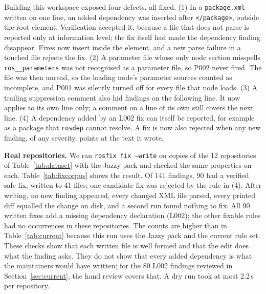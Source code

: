 \documentclass[conference]{IEEEtran}
\newcommand{\code}[1]{\texttt{#1}}
\begin{document}
Building this workspace exposed four defects, all fixed. (1) In a \code{package.xml} written on
one line, an added dependency was inserted after \code{</package>}, outside the root element.
Verification accepted it, because a file that does not parse is reported only at information
level; the fix itself had made the dependency finding disappear. Fixes now insert inside the
element, and a new parse failure in a touched file rejects the fix. (2) A parameter file whose
only node section misspells \code{ros\_\_parameters} was not recognised as a parameter file, so
P002 never fired. The file was then unread, so the loading node's parameter sources counted as
incomplete, and P001 was silently turned off for every file that node loads. (3) A trailing
suppression comment also hid findings on the following line. It now applies to its own line
only; a comment on a line of its own still covers the next line. (4) A dependency added by an
L002 fix can itself be reported, for example as a package that \code{rosdep} cannot resolve. A
fix is now also rejected when any new finding, of any severity, points at the text it wrote.

\textbf{Real repositories.} We ran \code{rosfix fix --write} on copies of the 12 repositories of
Table~\ref{tab:dataset} with the Jazzy pack and checked the same properties on each.
Table~\ref{tab:fixcorpus} shows the result. Of 141 findings, 90 had a verified safe fix, written
to 41 files; one candidate fix was rejected by the rule in (4). After writing, no new finding
appeared, every changed XML file parsed, every printed diff equalled the change on disk, and a
second run found nothing to fix. All 90 written fixes add a missing dependency declaration
(L002); the other fixable rules had no occurrences in these repositories. The counts are higher
than in Table~\ref{tab:current} because this run uses the Jazzy pack and the current rule set.
These checks show that each written file is well formed and that the edit does what the finding
asks. They do not show that every added dependency is what the maintainers would have written;
for the 80 L002 findings reviewed in Section~\ref{sec:current}, the hand review covers that. A dry run took at most 2.2\,s per repository.
\end{document}
